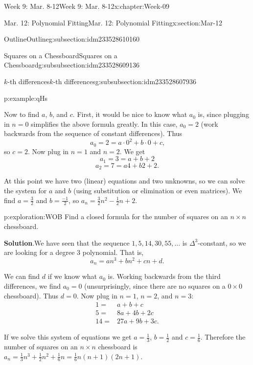 \documentclass[oneside,10pt,]{book}
\newcommand{\blocktitlefont}{\relax}
\numberwithin{equation}{section}
\newcommand{\amp}{&}
\begin{document}
\begin{chapterptx}{Week 9: Mar. 8-12}{}{Week 9: Mar. 8-12}{}{}{x:chapter:Week-09}
\begin{sectionptx}{Mar. 12: Polynomial Fitting}{}{Mar. 12: Polynomial Fitting}{}{}{x:section:Mar-12}
\begin{subsectionptx}{Outline}{}{Outline}{}{}{g:subsection:idm233528610160}
\begin{subsubsectionptx}{Squares on a Chessboard}{}{Squares on a Chessboard}{}{}{g:subsubsection:idm233528609136}
\begin{subsubsectionptx}{\(k\)-th differences}{}{\(k\)-th differences}{}{}{g:subsubsection:idm233528607936}
\begin{example}{}{p:example:qHs}
\begin{equation*}
\end{equation*}
%
\par
Now to find \(a\), \(b\), and \(c\). First, it would be nice to know what \(a_0\) is, since plugging in \(n = 0\) simplifies the above formula greatly. In this case, \(a_0 = 2\) (work backwards from the sequence of constant differences). Thus%
\begin{equation*}
a_0 = 2 = a\cdot 0^2 + b \cdot 0 + c\text{,}
\end{equation*}
so \(c = 2\). Now plug in \(n =1\) and \(n = 2\). We get%
\begin{equation*}
a_1 = 3 = a + b + 2
\end{equation*}
%
\begin{equation*}
a_2 = 7 = a4 + b 2 + 2\text{.}
\end{equation*}
%
\par
At this point we have two (linear) equations and two unknowns, so we can solve the system for \(a\) and \(b\) (using substitution or elimination or even matrices). We find \(a = \frac{3}{2}\) and \(b = \frac{-1}{2}\), so \(a_n = \frac{3}{2} n^2 - \frac{1}{2}n + 2\).%
\end{example}
\begin{exploration}{}{p:exploration:WOB}%
Find a closed formula for the number of squares on an \(n \times n\) chessboard.%
\par\smallskip%
\noindent\textbf{\blocktitlefont Solution}.\hypertarget{p:solution:HFD}{}\quad{}We have seen that the sequence \(1, 5, 14, 30, 55, \ldots\) is \(\Delta^3\)-constant, so we are looking for a degree 3 polynomial. That is,%
\begin{equation*}
a_n = an^3 + bn^2 + cn + d\text{.}
\end{equation*}
%
\par
We can find \(d\) if we know what \(a_0\) is. Working backwards from the third differences, we find \(a_0 = 0\) (unsurprisingly, since there are no squares on a \(0\times 0\) chessboard). Thus \(d = 0\). Now plug in \(n = 1\), \(n =2\), and \(n =3\):%
\begin{align*}
1 = \amp a + b + c\\
5 = \amp 8a + 4b + 2c\\
14 = \amp 27a + 9b + 3c\text{.}
\end{align*}
%
\par
If we solve this system of equations we get \(a = \frac{1}{3}\), \(b = \frac{1}{2}\) and \(c = \frac{1}{6}\). Therefore the number of squares on an \(n \times n\) chessboard is \(a_n = \frac{1}{3}n^3 + \frac{1}{2}n^2 + \frac{1}{6}n = \frac{1}{6}n(n+1)(2n+1)\).%

\end{exploration}
\end{subsubsectionptx}
\end{subsubsectionptx}
\end{subsectionptx}
\end{sectionptx}
\end{chapterptx}
\end{document}
